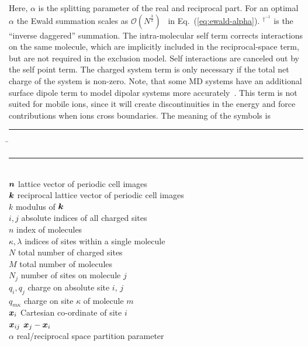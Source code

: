 \documentclass[11pt]{article}
\providecommand{\bm}[1]{\mbox{\boldmath${#1}$}}
\begin{document}
Here, $\alpha$ is the splitting parameter of the real and reciprocal
part. For an optimal $\alpha$ the Ewald summation scales as
$\mathcal{O}(N^{\frac{3}{2}})$~\cite{Ewal21,Finc94,PePL88}
in Eq.\ (\ref{eq:ewald-alpha}). $^{\dag^{-1}}$ is the ``inverse
daggered'' summation. The intra-molecular self term corrects 
interactions on the same molecule, which are implicitly included in
the reciprocal-space term, but are not required in the exclusion
model. Self interactions are canceled out by the self point
term. The charged system term is only necessary if the total net
charge of the system is non-zero. Note, that some MD systems have an
additional surface dipole term to model dipolar systems more
accurately~\cite{LPSm80,WaHo01}. This term is not
suited for mobile ions, since it will create discontinuities in the
energy and force contributions when ions cross boundaries. The meaning of the symbols is
\begin{tabbing}
\rule{2cm}{0cm} \= \rule{2cm}{0cm} \=\\
\> $\bm{n}$        \> lattice vector of periodic cell images \\
\> $\bm{k}$        \> reciprocal lattice vector of periodic cell images \\
\> $k$             \> modulus of $\bm{k}$ \\
\> $i,j$           \> absolute indices of all charged sites \\
\> $n$             \> index of molecules \\
\> $\kappa,\lambda$ \> indices of sites within a single molecule \\
\> $N$             \> total number of charged sites \\
\> $M$             \> total number of molecules \\
\> $N_j$           \> number of sites on molecule $j$ \\
\> $q_i, q_j$           \> charge on absolute site $i$, $j$ \\
\> $q_{m\kappa}$   \> charge on site $\kappa$ of molecule $m$ \\
\> $\bm{x}_i$      \> Cartesian co-ordinate of site $i$ \\
\> $\bm{x}_{ij}$   \> $\bm{x}_j - \bm{x}_i$ \\
\> $\alpha$        \> real/reciprocal space partition parameter
\end{tabbing}
\end{document}
